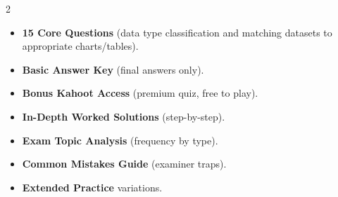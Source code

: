 \documentclass[11pt,a4paper]{article}
\newcommand{\FullReleaseDate}{April 30, 2026}
\begin{document}
\vspace{8pt}

\begin{multicols}{2}
  \begin{tcolorbox}[card, title=\sffamily\bfseries\textcolor{white}{\faHandPointDown\ TODAY (Simplified Version)}, colbacktitle=mainblue, boxed title style={sharp corners, boxrule=0pt}]
    \begin{itemize}[leftmargin=1.2em, itemsep=2pt]
      \item \small \textbf{15 Core Questions} (data type classification and matching datasets to appropriate charts/tables).
      \item \small \textbf{Basic Answer Key} (final answers only).
      \item \small \textbf{Bonus Kahoot Access} (premium quiz, free to play).
    \end{itemize}
  \end{tcolorbox}

  \columnbreak

  \begin{tcolorbox}[card, title=\sffamily\bfseries\textcolor{white}{\faRocket\ ON \FullReleaseDate\ (Full Upgrade)}, colbacktitle=mainblue, boxed title style={sharp corners, boxrule=0pt}]
    \begin{itemize}[leftmargin=1.2em, itemsep=2pt]
      \item \small \textbf{In-Depth Worked Solutions} (step-by-step).
      \item \small \textbf{Exam Topic Analysis} (frequency by type).
      \item \small \textbf{Common Mistakes Guide} (examiner traps).
      \item \small \textbf{Extended Practice} variations.
    \end{itemize}
  \end{tcolorbox}
\end{multicols}
\end{document}
